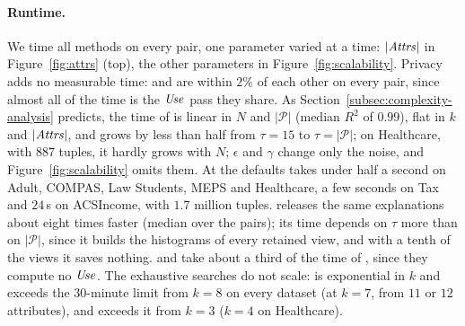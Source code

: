 \paragraph{Runtime.}
\label{subsec:scalability}
We time all methods on every pair, one parameter varied at a time: $|\mathit{Attrs}|$ in Figure~\ref{fig:attrs} (top), the other parameters in Figure~\ref{fig:scalability}.
Privacy adds no measurable time: \sys{} and \Bone{} are within $2\%$ of each other on every pair, since almost all of the time is the $\mathit{Use}$ pass they share.
As Section~\ref{subsec:complexity-analysis} predicts, the time of \sys{} is linear in $N$ and $|\mathcal{P}|$ (median $R^2$ of $0.99$), flat in $k$ and $|\mathit{Attrs}|$, and grows by less than half from $\tau=15$ to $\tau=|\mathcal{P}|$; on Healthcare, with $887$ tuples, it hardly grows with $N$; $\epsilon$ and $\gamma$ change only the noise, and Figure~\ref{fig:scalability} omits them.
At the defaults \sys{} takes under half a second on Adult, COMPAS, Law Students, MEPS and Healthcare, a few seconds on Tax and $24$\,s on ACSIncome, with $1.7$ million tuples.
\sysopt{} releases the same explanations about eight times faster (median over the pairs); its time depends on $\tau$ more than on $|\mathcal{P}|$, since it builds the histograms of every retained view, and with a tenth of the views it saves nothing.
\BF{} and \SingleStage{} take about a third of the time of \sys{}, since they compute no $\mathit{Use}$.
The exhaustive searches do not scale: \TopKExh{} is exponential in $k$ and exceeds the $30$-minute limit from $k=8$ on every dataset (at $k=7$, from $11$ or $12$ attributes), and \FullExh{} exceeds it from $k=3$ ($k=4$ on Healthcare).
